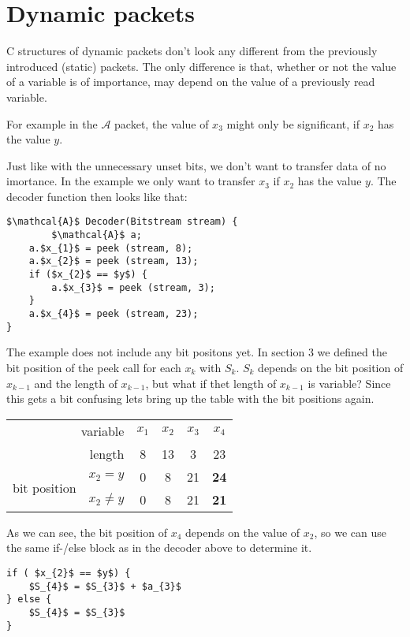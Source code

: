 \documentclass[parskip=half,paper=a4,DIV=13]{scrartcl}
\begin{document}
\section{Dynamic packets}

C structures of dynamic packets don't look any different from the previously introduced (static) packets.
The only difference is that, whether or not the value of a variable is of importance, may depend
on the value of a previously read variable.

For example in the $\mathcal{A}$ packet, the value of $x_{3}$ might only be significant,
if $x_{2}$ has the value $y$.

Just like with the unnecessary unset bits, we don't want to transfer data of no imortance.
In the example we only want to transfer $x_{3}$ if $x_{2}$ has the value $y$.
The decoder function then looks like that:

\begin{lstlisting}[mathescape]
$\mathcal{A}$ Decoder(Bitstream stream) {
        $\mathcal{A}$ a;
	a.$x_{1}$ = peek (stream, 8);
	a.$x_{2}$ = peek (stream, 13);
	if ($x_{2}$ == $y$) {
		a.$x_{3}$ = peek (stream, 3);
	}
	a.$x_{4}$ = peek (stream, 23);
}
\end{lstlisting}

The example does not include any bit positons yet. 
In section 3 we defined the bit position of the peek call for each $x_{k}$ with $S_{k}$.
$S_{k}$ depends on the bit position of $x_{k-1}$ and the length of $x_{k-1}$,
but what if thet length of $x_{k-1}$ is variable?
Since this gets a bit confusing lets bring up the table with the bit positions again. 

\begin{center}
\begin{tabular}{l r | cccc}
	\multicolumn{2}{r|}{variable} &$x_{1}$ &$x_{2}$ &$x_{3}$ &$x_{4}$\\
	\multicolumn{2}{r|}{length} &8 &13 &3 &23\\
	\multirow{2}{*}{bit position} &$x_{2} = y$  &0 &8 &21 &\bf{24}\\
	 &$x_{2} \neq y$  &0 &8 &21 &\bf{21}
\end{tabular}
\end{center}

As we can see, the bit position of $x_{4}$ depends on the value of $x_{2}$, so we can use
the same if-/else block as in the decoder above to determine it.

\begin{lstlisting}[mathescape]
if ( $x_{2}$ == $y$) {
	$S_{4}$ = $S_{3}$ + $a_{3}$
} else {
	$S_{4}$ = $S_{3}$
}
\end{lstlisting}
\end{document}
